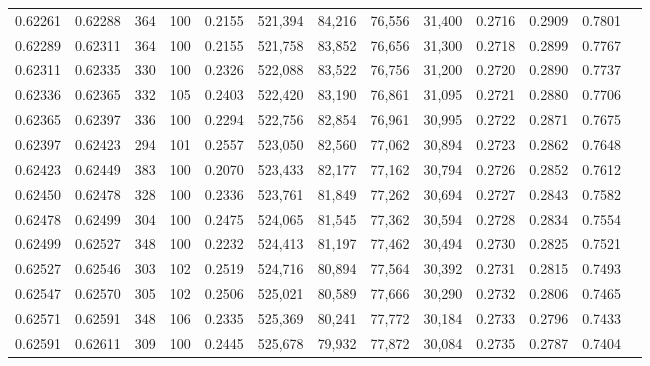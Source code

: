 \begin{tabular}{rrrrrrrrrrrrr}
0.62261 & 0.62288 &   364 & 100 &                                     0.2155 & 521,394 &  84,216 &  76,556 &  31,400 & 0.2716 & 0.2909 & 0.7801 \\
0.62289 & 0.62311 &   364 & 100 &                                     0.2155 & 521,758 &  83,852 &  76,656 &  31,300 & 0.2718 & 0.2899 & 0.7767 \\
0.62311 & 0.62335 &   330 & 100 &                                     0.2326 & 522,088 &  83,522 &  76,756 &  31,200 & 0.2720 & 0.2890 & 0.7737 \\
0.62336 & 0.62365 &   332 & 105 &                                     0.2403 & 522,420 &  83,190 &  76,861 &  31,095 & 0.2721 & 0.2880 & 0.7706 \\
0.62365 & 0.62397 &   336 & 100 &                                     0.2294 & 522,756 &  82,854 &  76,961 &  30,995 & 0.2722 & 0.2871 & 0.7675 \\
0.62397 & 0.62423 &   294 & 101 &                                     0.2557 & 523,050 &  82,560 &  77,062 &  30,894 & 0.2723 & 0.2862 & 0.7648 \\
0.62423 & 0.62449 &   383 & 100 &                                     0.2070 & 523,433 &  82,177 &  77,162 &  30,794 & 0.2726 & 0.2852 & 0.7612 \\
0.62450 & 0.62478 &   328 & 100 &                                     0.2336 & 523,761 &  81,849 &  77,262 &  30,694 & 0.2727 & 0.2843 & 0.7582 \\
0.62478 & 0.62499 &   304 & 100 &                                     0.2475 & 524,065 &  81,545 &  77,362 &  30,594 & 0.2728 & 0.2834 & 0.7554 \\
0.62499 & 0.62527 &   348 & 100 &                                     0.2232 & 524,413 &  81,197 &  77,462 &  30,494 & 0.2730 & 0.2825 & 0.7521 \\
0.62527 & 0.62546 &   303 & 102 &                                     0.2519 & 524,716 &  80,894 &  77,564 &  30,392 & 0.2731 & 0.2815 & 0.7493 \\
0.62547 & 0.62570 &   305 & 102 &                                     0.2506 & 525,021 &  80,589 &  77,666 &  30,290 & 0.2732 & 0.2806 & 0.7465 \\
0.62571 & 0.62591 &   348 & 106 &                                     0.2335 & 525,369 &  80,241 &  77,772 &  30,184 & 0.2733 & 0.2796 & 0.7433 \\
0.62591 & 0.62611 &   309 & 100 &                                     0.2445 & 525,678 &  79,932 &  77,872 &  30,084 & 0.2735 & 0.2787 & 0.7404 \\

\end{tabular}

